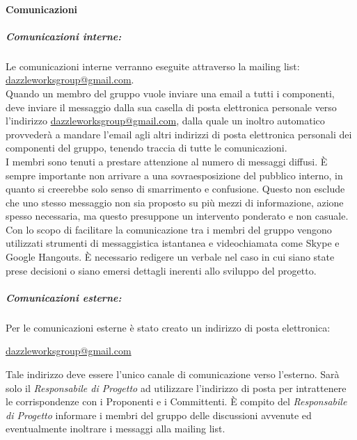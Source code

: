 		\paragraph{Comunicazioni}
			\subparagraph{Comunicazioni interne:}
			Le comunicazioni interne verranno eseguite attraverso la mailing list: \url{dazzleworksgroup@gmail.com}. \\ 
			Quando un membro del gruppo vuole inviare una email a tutti i componenti, deve inviare il messaggio dalla sua casella di posta elettronica personale verso l'indirizzo \url{dazzleworksgroup@gmail.com}, dalla quale un inoltro automatico provvederà a mandare l'email agli altri indirizzi di posta elettronica personali dei componenti del gruppo, tenendo traccia di tutte le comunicazioni.\\ 
			I membri sono tenuti a prestare attenzione al numero di messaggi diffusi. È sempre importante non arrivare a una sovraesposizione del pubblico interno, in quanto si creerebbe solo senso di smarrimento e confusione. Questo non esclude che uno stesso messaggio non sia proposto su più mezzi di informazione, azione spesso necessaria, ma questo presuppone un intervento ponderato e non casuale.\\
			Con lo scopo di facilitare la comunicazione tra i membri del gruppo vengono utilizzati strumenti di messaggistica istantanea e videochiamata come \gls{Skype} e \gls{Google Hangouts}.
			È necessario redigere un \gls{verbale} nel caso in cui siano state prese decisioni o siano emersi dettagli inerenti allo sviluppo del progetto. 
			\subparagraph{Comunicazioni esterne:}
			Per le comunicazioni esterne è stato creato un indirizzo di posta elettronica:
			\begin{center}
				\url{dazzleworksgroup@gmail.com}
			\end{center}
			Tale indirizzo deve essere l'unico canale di comunicazione verso l'esterno. Sarà solo il \textit{Responsabile di Progetto} ad utilizzare l'indirizzo di posta per intrattenere le corrispondenze con i Proponenti e i Committenti. È compito del \textit{Responsabile di Progetto} informare i membri del gruppo delle discussioni avvenute ed eventualmente inoltrare i messaggi alla mailing list.
			
